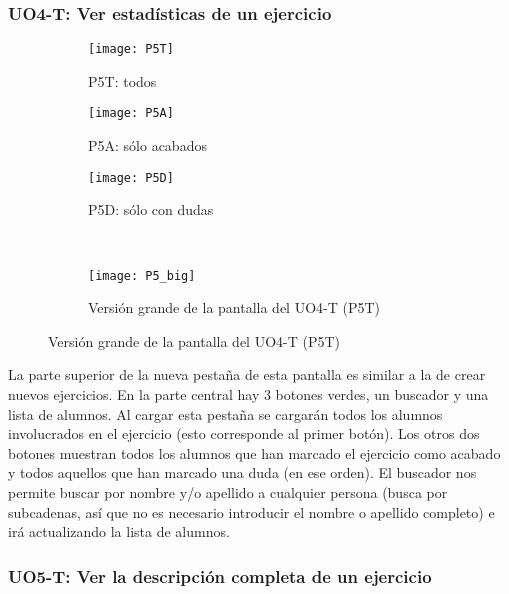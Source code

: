 \subsubsection{UO4-T: Ver estadísticas de un ejercicio}
\label{diseno-e-implementacion:interfaces:profesor:uo4-t}

\begin{figure}[H]
\begin{subfigure}[b]{0.3\textwidth}
	\centering
	\texttt{[image: P5T]}
	\caption{P5T: todos}
	\label{fig:diseno-e-implementacion:interfaces:profesor:uo4-t:p5t}
\end{subfigure}
%
\begin{subfigure}[b]{0.3\textwidth}
	\centering
	\texttt{[image: P5A]}
	\caption{P5A: sólo acabados}
	\label{fig:diseno-e-implementacion:interfaces:profesor:uo4-t:p5a}
\end{subfigure}
%
\begin{subfigure}[b]{0.3\textwidth}
	\centering
	\texttt{[image: P5D]}
	\caption{P5D: sólo con dudas}
	\label{fig:diseno-e-implementacion:interfaces:profesor:uo4-t:p5d}
\end{subfigure}
\\
\begin{subfigure}[b]{\textwidth}
	\centering
	\texttt{[image: P5\_big]}
	\caption{Versión grande de la pantalla del UO4-T (P5T)}
	\label{fig:diseno-e-implementacion:interfaces:profesor:uo4-t:p5a-big}
\end{subfigure}

\label{fig:diseno-e-implementacion:interfaces:profesor:uo4-t}
\end{figure}

La parte superior de la nueva pestaña de esta pantalla es similar a la de crear nuevos ejercicios. En la parte central hay 3 botones verdes, un buscador y una lista de alumnos. Al cargar esta pestaña se cargarán todos los alumnos involucrados en el ejercicio (esto corresponde al primer botón). Los otros dos botones muestran todos los alumnos que han marcado el ejercicio como acabado y todos aquellos que han marcado una duda (en ese orden). El buscador nos permite buscar por nombre y/o apellido a cualquier persona (busca por subcadenas, así que no es necesario introducir el nombre o apellido completo) e irá actualizando la lista de alumnos.\\

\subsubsection{UO5-T: Ver la descripción completa de un ejercicio}
\label{diseno-e-implementacion:interfaces:profesor:uo5-t}

